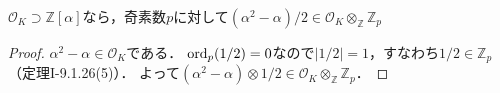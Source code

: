 %
%

\begin{screen}
  $\mathcal{O}_K\supset\mathbb{Z}[\alpha]$なら，奇素数$p$に対して$(\alpha^2-\alpha)/2\in\mathcal{O}_K\otimes_\mathbb{Z}\mathbb{Z}_p$
\end{screen}
\begin{proof}
  $\alpha^2-\alpha\in\mathcal{O}_K$である．
  $\operatorname{ord}_p(1/2)=0$なので$\lvert1/2\rvert=1$，すなわち$1/2\in\mathbb{Z}_p$（定理I-9.1.26(5)）．
  よって$(\alpha^2-\alpha) \otimes 1/2\in\mathcal{O}_K\otimes_\mathbb{Z}\mathbb{Z}_p$．
\end{proof}

